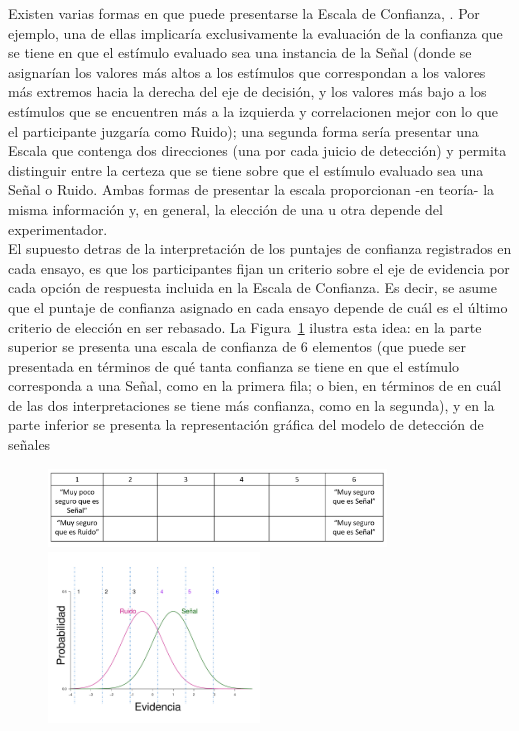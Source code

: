 \begin{itemize}
Existen varias formas en que puede presentarse la Escala de Confianza, \parencite{McNicol2}. Por ejemplo, una de ellas implicaría exclusivamente la evaluación de la confianza que se tiene en que el estímulo evaluado sea una instancia de la Señal (donde se asignarían los valores más altos a los estímulos que correspondan a los valores más extremos hacia la derecha del eje de decisión, y los valores más bajo a los estímulos que se encuentren más a la izquierda y correlacionen mejor con lo que el participante juzgaría como Ruido); una segunda forma sería presentar una Escala que contenga dos direcciones (una por cada juicio de detección) y permita distinguir entre la certeza que se tiene sobre que el estímulo evaluado sea una Señal o Ruido. Ambas formas de presentar la escala proporcionan -en teoría- la misma información y, en general, la elección de una u otra depende del experimentador.\\

El supuesto detras de la interpretación de los puntajes de confianza registrados en cada ensayo, es que los participantes fijan un criterio sobre el eje de evidencia por cada opción de respuesta incluida en la Escala de Confianza. Es decir, se asume que el puntaje de confianza asignado en cada ensayo depende de cuál es el último criterio de elección en ser rebasado. La Figura~\ref{fig:Conf_Rat} ilustra esta idea: en la parte superior se presenta una escala de confianza de 6 elementos (que puede ser presentada en términos de qué tanta confianza se tiene en que el estímulo corresponda a una Señal, como en la primera fila; o bien, en términos de en cuál de las dos interpretaciones se tiene más confianza, como en la segunda), y en la parte inferior se presenta la representación gráfica del modelo de detección de señales\\

\begin{figure}[th]
\centering
\includegraphics[width=0.80\textwidth]{Figures/Puntajes_Criterios}\\
\includegraphics[width=0.50\textwidth]{Figures/ConfidenceRating}\\
\caption[Ejemplo ]{}
\label{fig:Conf_Rat}
\end{figure}



\end{itemize}
